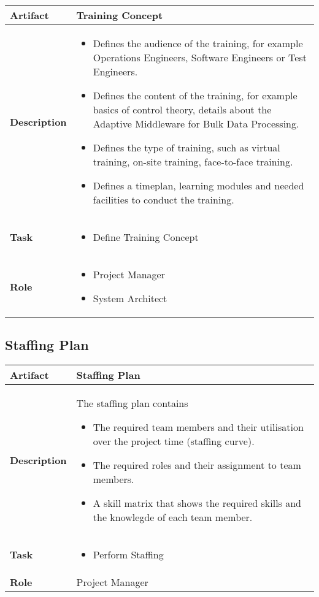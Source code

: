 \begin{tabularx}{\textwidth}{@{} l X @{}}
	\caption{Training Concept} \label{table:ch6_Artifact_Training_Concept}\\
	\toprule 
	\bfseries Artifact & Training Concept\\
	\midrule 
	\bfseries Description & 
	\begin{itemize}
		\item Defines the audience of the training, for example Operations Engineers, Software Engineers or Test Engineers.
		\item Defines the content of the training, for example basics of control theory, details about the Adaptive Middleware for Bulk Data Processing.
		\item Defines the type of training, such as virtual training, on-site training, face-to-face training. 
		\item Defines a timeplan, learning modules and needed facilities to conduct the training.
	\end{itemize}
	\\
	\midrule 
	\bfseries Task & 
	\begin{itemize}
		\item Define Training Concept
	\end{itemize}
	\\
	\midrule 
	\bfseries Role & 
	\begin{itemize}
		\item Project Manager
		\item System Architect
	\end{itemize}
	\\
	\bottomrule 
\end{tabularx}


\subsection{Staffing Plan}

\begin{tabularx}{\textwidth}{@{} l X @{}}
	\caption{Training Concept} \label{table:ch6_Artifact_Staffing_Plan}\\
	\toprule 
	\bfseries Artifact & Staffing Plan\\
	\midrule 
	\bfseries Description & The staffing plan contains
	\begin{itemize}
		\item The required team members and their utilisation over the project time (staffing curve).
		\item The required roles and their assignment to team members.
		\item A skill matrix that shows the required skills and the knowlegde of each team member.
	\end{itemize}
	\\
	\midrule 
	\bfseries Task & 
	\begin{itemize}
		\item Perform Staffing
	\end{itemize}
	\\
	\midrule 
	\bfseries Role & Project Manager\\
	\bottomrule 
\end{tabularx}


